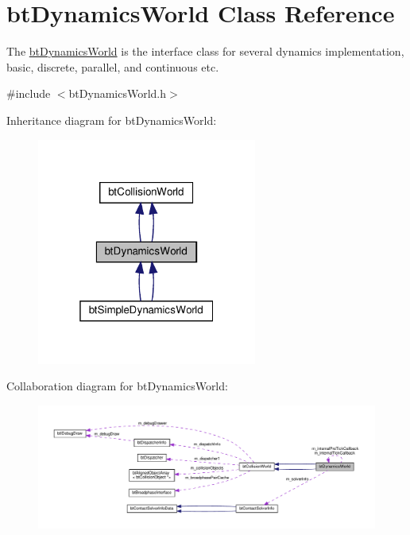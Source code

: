 \hypertarget{classbtDynamicsWorld}{}\section{bt\+Dynamics\+World Class Reference}
\label{classbtDynamicsWorld}


The \hyperlink{classbtDynamicsWorld}{bt\+Dynamics\+World} is the interface class for several dynamics implementation, basic, discrete, parallel, and continuous etc.  




{\ttfamily \#include $<$bt\+Dynamics\+World.\+h$>$}



Inheritance diagram for bt\+Dynamics\+World\+:
\nopagebreak
\begin{figure}[H]
\begin{center}
\leavevmode
\includegraphics[width=205pt]{classbtDynamicsWorld__inherit__graph}
\end{center}
\end{figure}


Collaboration diagram for bt\+Dynamics\+World\+:
\nopagebreak
\begin{figure}[H]
\begin{center}
\leavevmode
\includegraphics[width=350pt]{classbtDynamicsWorld__coll__graph}
\end{center}
\end{figure}
